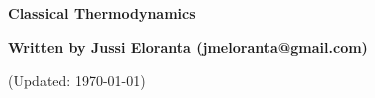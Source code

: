 \documentclass[serif]{beamer}
\begin{document}
\phantom{hauki}
\vfill
\begin{center}
\textbf{Classical Thermodynamics}\\

\vspace{1cm}

\textbf{Written by Jussi Eloranta (jmeloranta@gmail.com)}\\

\vspace{1cm}

{\tiny (Updated: \today)}

\end{center}
\vfill
\newpage













\end{document}
